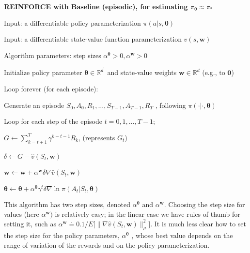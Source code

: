 \documentclass{article}
\begin{document}
\textbf{REINFORCE with Baseline (episodic), for estimating $\pi_{\pmb{\theta}} \approx \pi_*$}

Input: a differentiable policy parameterization $\pi ( a | s , \pmb { \theta } )$

Input: a differentiable state-value function parameterization $\hat { v } ( s , \mathbf { w } )$

Algorithm parameters: step sizes $\alpha ^ { \pmb { \theta } } > 0 ,   \alpha ^ { \mathbf { w } } > 0$

Initialize policy parameter $\pmb { \theta } \in \mathbb { R } ^ { d ^ { \prime } }$ and state-value weights $\mathbf { w } \in \mathbb { R } ^ { d }$ (e.g., to $\mathbf { 0 }$)

Loop forever (for each episode):

\hspace{.5cm} Generate an episode $S _ { 0 } , A _ { 0 } , R _ { 1 } , \ldots , S _ { T - 1 } , A _ { T - 1 } , R _ { T }$ , following $\pi ( \cdot | \cdot , \pmb{\theta} )$

\hspace{.5cm} Loop for each step of the episode $t = 0 , 1 , \ldots , T - 1$;

\hspace{1cm} $G \gets \sum _ { k = t + 1 } ^ { T } \gamma ^ { k - t - 1 } R _ { k }$, (represents $G_t$)

\hspace{1cm} $\delta \leftarrow G - \hat { v } ( S _ { t } \mathbf { , } \mathbf { w } )$

\hspace{1cm} $\mathbf { w } \leftarrow \mathbf { w } + \alpha ^ { \mathbf { w } }   \delta   \nabla \hat { v } ( S _ { t } \mathbf { , } \mathbf { w } )$

\hspace{1cm} $\pmb { \theta } \leftarrow \pmb { \theta } + \alpha ^ { \pmb { \theta } } \gamma ^ { t } \delta \nabla \ln \pi ( A _ { t } | S _ { t } , \pmb { \theta } )$

This algorithm has two step sizes, denoted $\alpha ^ { \pmb{\theta} }$ and $\alpha ^ { \mathbf { w } }$. Choosing the step size for values (here $\alpha ^ { \mathbf { w } } )$ is relatively easy; in the linear case we have rules of thumb for setting it, 
such as $\alpha ^ { \mathbf { w } } \stackrel { \cdot } { = } 0 . 1 / E \big [ \| \nabla \hat { v } ( S _ { t } , \mathbf { w } ) \| _ { \mu } ^ { 2 } \big ]$. It is much less clear how to set the step size for the policy parameters, 
$\alpha ^ { \pmb{\theta} }$ , whose best value depends on the range of variation of the rewards and on the policy parameterization.
\end{document}
